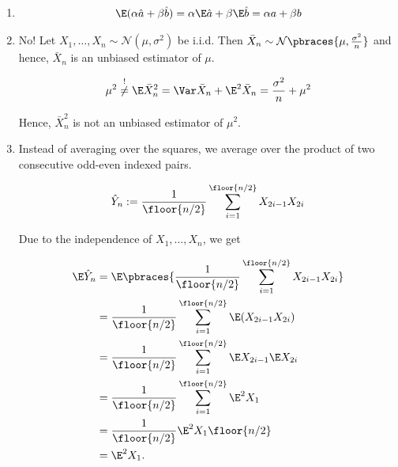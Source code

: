 \begin{solution}

\phantom{}

\begin{enumerate}[label = (\alph*)]

    \item

    \begin{align*}
        \E(\alpha \hat a + \beta \hat b)
        =
        \alpha \E \hat a + \beta \E \hat b
        =
        \alpha a + \beta b
    \end{align*}

    \item No!
    Let $X_1, \dots, X_n \sim \mathcal N(\mu, \sigma^2)$ be i.i.d.
    Then $\bar X_n \sim \mathcal N \pbraces{\mu, \frac{\sigma^2}{n}}$ and hence, $\bar X_n$ is an unbiased estimator of $\mu$.

    \begin{align*}
        \mu^2
        \stackrel{!}{\neq}
        \E \bar X_n^2
        =
        \Var \bar X_n + \E^2 \bar X_n
        =
        \frac{\sigma^2}{n} + \mu^2
    \end{align*}

    Hence, $\bar X_n^2$ is not an unbiased estimator of $\mu^2$.

    \item Instead of averaging over the squares, we average over the product of two consecutive odd-even indexed pairs.
    
    \begin{align*}
        \hat Y_n
        :=
        \frac{1}{\floor{n/2}}
        \sum_{i=1}^\floor{n/2}
            X_{2 i - 1} X_{2 i}
    \end{align*}

    Due to the independence of $X_1, \dots, X_n$, we get

    \begin{align*}
        \E \hat Y_n
        & =
        \E
        \pbraces
        {
            \frac{1}{\floor{n/2}}
            \sum_{i=1}^\floor{n/2}
                X_{2 i - 1} X_{2 i}    
        } \\
        & =
        \frac{1}{\floor{n/2}}
        \sum_{i=1}^\floor{n/2}
            \E(X_{2 i - 1} X_{2 i}) \\
        & =
        \frac{1}{\floor{n/2}}
        \sum_{i=1}^\floor{n/2}
            \E X_{2 i - 1} \E X_{2 i} \\
        & =
        \frac{1}{\floor{n/2}}
        \sum_{i=1}^\floor{n/2}
            \E^2 X_1 \\
        & =
        \frac{1}{\floor{n/2}}
        \E^2 X_1
        \floor{n/2} \\
        & =
        \E^2 X_1.
    \end{align*}

\end{enumerate}

\end{solution}

